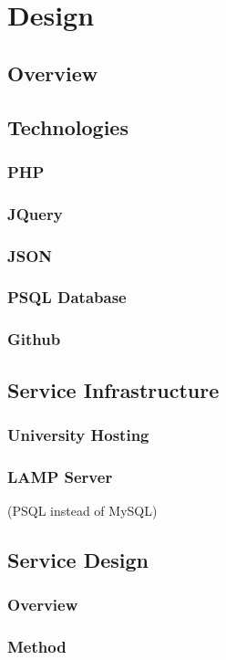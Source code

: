 \documentclass[11pt]{article}
\begin{document}
\section{Design}
	\subsection{Overview}
	\subsection{Technologies}
		\subsubsection{PHP}
		\subsubsection{JQuery}
		\subsubsection{JSON}
		\subsubsection{PSQL Database}
		\subsubsection{Github}
	\subsection{Service Infrastructure}
		\subsubsection{University Hosting}
		\subsubsection{LAMP Server}
			(PSQL instead of MySQL)
	\subsection{Service Design}
		\subsubsection{Overview}
		\subsubsection{Method}
\end{document}
